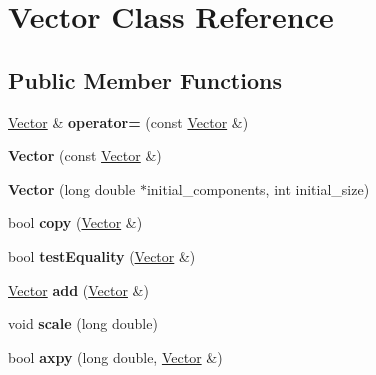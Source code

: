 \hypertarget{classVector}{\section{Vector Class Reference}
\label{classVector}
}
\subsection*{Public Member Functions}
\begin{DoxyCompactItemize}
\item 
\hypertarget{classVector_af4c2769384d324e1a806e463edb1832c}{\hyperlink{classVector}{Vector} \& {\bfseries operator=} (const \hyperlink{classVector}{Vector} \&)}\label{classVector_af4c2769384d324e1a806e463edb1832c}

\item 
\hypertarget{classVector_a130470658bcf6440baa7280f4b94449b}{{\bfseries Vector} (const \hyperlink{classVector}{Vector} \&)}\label{classVector_a130470658bcf6440baa7280f4b94449b}

\item 
\hypertarget{classVector_a7584aaf0d48fcb1c1e6cf45b0d9b22ec}{{\bfseries Vector} (long double $\ast$initial\-\_\-components, int initial\-\_\-size)}\label{classVector_a7584aaf0d48fcb1c1e6cf45b0d9b22ec}

\item 
\hypertarget{classVector_a046070750b33273f1fd1df09582a28b0}{bool {\bfseries copy} (\hyperlink{classVector}{Vector} \&)}\label{classVector_a046070750b33273f1fd1df09582a28b0}

\item 
\hypertarget{classVector_a1e202fc4d4c56347ac464677af534430}{bool {\bfseries test\-Equality} (\hyperlink{classVector}{Vector} \&)}\label{classVector_a1e202fc4d4c56347ac464677af534430}

\item 
\hypertarget{classVector_a40ae6316bffe1ddfb1068fa9434e1ff1}{\hyperlink{classVector}{Vector} {\bfseries add} (\hyperlink{classVector}{Vector} \&)}\label{classVector_a40ae6316bffe1ddfb1068fa9434e1ff1}

\item 
\hypertarget{classVector_a43e0c29e3eeb59c0e12586ebb3d17dc8}{void {\bfseries scale} (long double)}\label{classVector_a43e0c29e3eeb59c0e12586ebb3d17dc8}

\item 
\hypertarget{classVector_a6640cb8484e59c0f170b52e623f75fef}{bool {\bfseries axpy} (long double, \hyperlink{classVector}{Vector} \&)}\label{classVector_a6640cb8484e59c0f170b52e623f75fef}


\end{DoxyCompactItemize}
